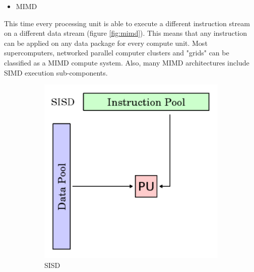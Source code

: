 \documentclass[a4paper, 11pt]{report}
\begin{document}
	\begin{itemize}
		\item MIMD
	\end{itemize}
This time every processing unit is able to execute a different instruction stream on a different data stream (figure \ref{fig:mimd}). This means that any instruction can be applied on any data package for every compute unit. Most supercomputers, networked parallel computer clusters and "grids" can be classified as a MIMD compute system. Also, many MIMD architectures include SIMD execution sub-components.

\begin{figure}[ht]
	\centering
	\begin{subfigure}[t]{0.4\textwidth}
		\centering
		\includegraphics[scale=.3]{images/sisd.pdf}
		\caption{SISD}\label{fig:sisd}
	\end{subfigure}
	\begin{subfigure}[t]{0.4\textwidth}
		\centering

\end{subfigure}
\end{figure}
\end{document}
